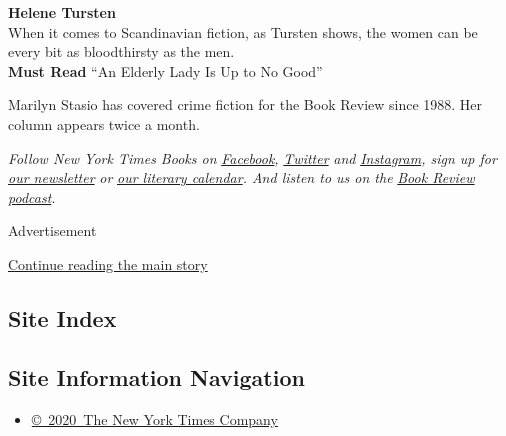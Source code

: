 \textbf{Helene Tursten}\\
When it comes to Scandinavian fiction, as Tursten shows, the women can
be every bit as bloodthirsty as the men.\\
\textbf{Must Read} ``An Elderly Lady Is Up to No Good''

Marilyn Stasio has covered crime fiction for the Book Review since 1988.
Her column appears twice a month.

\emph{Follow New York Times Books on}
\href{https://www.facebookcorewwwi.onion/nytbooks/}{\emph{Facebook}}\emph{,}
\href{https://twitter.com/nytimesbooks}{\emph{Twitter}} \emph{and}
\href{https://www.instagram.com/nytbooks/}{\emph{Instagram}}\emph{, sign
up for}
\href{https://www.nytimes3xbfgragh.onion/newsletters/books-review}{\emph{our
newsletter}} \emph{or}
\href{https://www.nytimes3xbfgragh.onion/interactive/2017/books/books-calendar.html}{\emph{our
literary calendar}}\emph{. And listen to us on the}
\href{https://www.nytimes3xbfgragh.onion/column/book-review-podcast}{\emph{Book
Review podcast}}\emph{.}

Advertisement

\protect\hyperlink{after-bottom}{Continue reading the main story}

\hypertarget{site-index}{%
\subsection{Site Index}\label{site-index}}

\hypertarget{site-information-navigation}{%
\subsection{Site Information
Navigation}\label{site-information-navigation}}

\begin{itemize}
\tightlist
\item
  \href{https://help.nytimes3xbfgragh.onion/hc/en-us/articles/115014792127-Copyright-notice}{©~2020~The
  New York Times Company}
\end{itemize}

